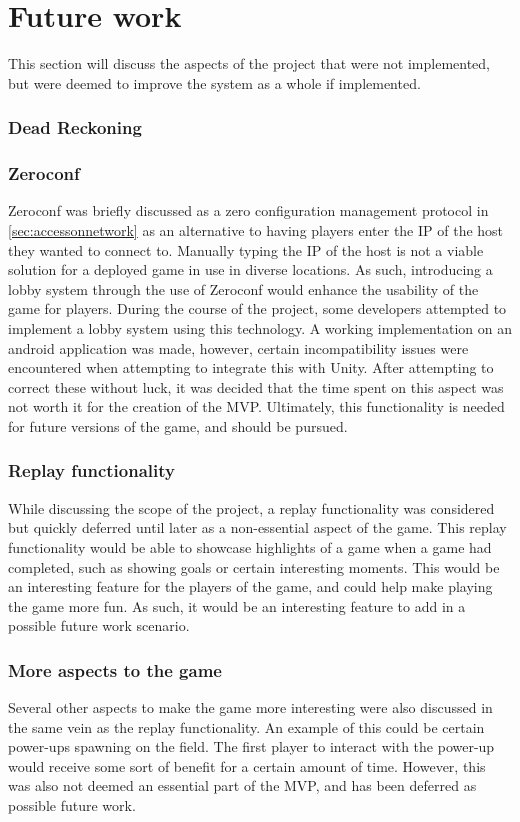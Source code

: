 \section{Future work}
This section will discuss the aspects of the project that were not implemented, but were deemed to improve the system as a whole if implemented.

\subsubsection{Dead Reckoning}

\subsubsection{Zeroconf}
Zeroconf was briefly discussed as a zero configuration management protocol in \autoref{sec:accessonnetwork} as an alternative to having players enter the IP of the host they wanted to connect to.
Manually typing the IP of the host is not a viable solution for a deployed game in use in diverse locations.
As such, introducing a lobby system through the use of Zeroconf would enhance the usability of the game for players.
During the course of the project, some developers attempted to implement a lobby system using this technology.
A working implementation on an android application was made, however, certain incompatibility issues were encountered when attempting to integrate this with Unity.
After attempting to correct these without luck, it was decided that the time spent on this aspect was not worth it for the creation of the MVP.
Ultimately, this functionality is needed for future versions of the game, and should be pursued.

\subsubsection{Replay functionality}
While discussing the scope of the project, a replay functionality was considered but quickly deferred until later as a non-essential aspect of the game.
This replay functionality would be able to showcase highlights of a game when a game had completed, such as showing goals or certain interesting moments.
This would be an interesting feature for the players of the game, and could help make playing the game more fun.
As such, it would be an interesting feature to add in a possible future work scenario.

\subsubsection{More aspects to the game}
Several other aspects to make the game more interesting were also discussed in the same vein as the replay functionality.
An example of this could be certain power-ups spawning on the field.
The first player to interact with the power-up would receive some sort of benefit for a certain amount of time.
However, this was also not deemed an essential part of the MVP, and has been deferred as possible future work.


